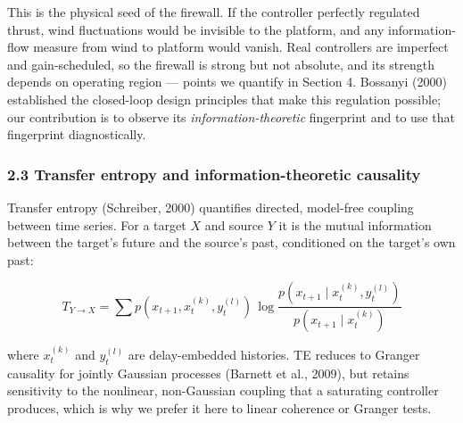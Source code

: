 \documentclass[
  english,
  11pt,
]{article}
\begin{document}
This is the physical seed of the firewall. If the controller perfectly
regulated thrust, wind fluctuations would be invisible to the platform,
and any information-flow measure from wind to platform would vanish.
Real controllers are imperfect and gain-scheduled, so the firewall is
strong but not absolute, and its strength depends on operating region
--- points we quantify in Section 4. Bossanyi (2000) established the
closed-loop design principles that make this regulation possible; our
contribution is to observe its \emph{information-theoretic} fingerprint
and to use that fingerprint diagnostically.

\subsubsection{2.3 Transfer entropy and information-theoretic
causality}\label{transfer-entropy-and-information-theoretic-causality}

Transfer entropy (Schreiber, 2000) quantifies directed, model-free
coupling between time series. For a target \(X\) and source \(Y\) it is
the mutual information between the target's future and the source's
past, conditioned on the target's own past:

\[
T_{Y \to X} = \sum p\!\left(x_{t+1}, x_t^{(k)}, y_t^{(l)}\right)\, \log \frac{p\!\left(x_{t+1} \mid x_t^{(k)}, y_t^{(l)}\right)}{p\!\left(x_{t+1} \mid x_t^{(k)}\right)}
\]

where \(x_t^{(k)}\) and \(y_t^{(l)}\) are delay-embedded histories. TE
reduces to Granger causality for jointly Gaussian processes (Barnett et
al., 2009), but retains sensitivity to the nonlinear, non-Gaussian
coupling that a saturating controller produces, which is why we prefer
it here to linear coherence or Granger tests.
\end{document}

